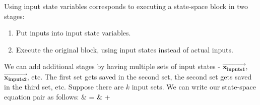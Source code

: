 
    Using input state variables corresponds to executing a state-space
block in two stages:
\begin{enumerate}
\vspace{\itemshrink} \item Put inputs into input state variables.

\vspace{\itemshrink} \item Execute the original block, using input states instead of
actual inputs.
\vspace{\itemshrink} \end{enumerate}

    We can add additional stages by having multiple sets of input
states - $\vec{\mathbf{x_{inputs1}}}$,
$\vec{\mathbf{x_{inputs2}}}$, etc. The first set gets saved in the
second set, the second set gets saved in the third set, etc.
Suppose there are $k$ input sets. We can write our state-space
equation pair as follows:
\starteqnstar
{} & = &  
+ 
